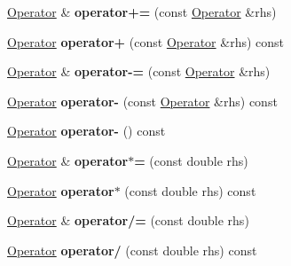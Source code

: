 \begin{DoxyCompactItemize}
\item 
\hypertarget{classOperator_a0b20b0fedb0f49c4a2e69507cdcb540b}{\hyperlink{classOperator}{Operator} \& {\bfseries operator+=} (const \hyperlink{classOperator}{Operator} \&rhs)}\label{classOperator_a0b20b0fedb0f49c4a2e69507cdcb540b}

\item 
\hypertarget{classOperator_a67d89d71379a609aa018178afe1adb8d}{\hyperlink{classOperator}{Operator} {\bfseries operator+} (const \hyperlink{classOperator}{Operator} \&rhs) const }\label{classOperator_a67d89d71379a609aa018178afe1adb8d}

\item 
\hypertarget{classOperator_a1235ee7e0ba5220a831ac0c01b2210b9}{\hyperlink{classOperator}{Operator} \& {\bfseries operator-\/=} (const \hyperlink{classOperator}{Operator} \&rhs)}\label{classOperator_a1235ee7e0ba5220a831ac0c01b2210b9}

\item 
\hypertarget{classOperator_ac25a9769a621623062b922cb9a40a489}{\hyperlink{classOperator}{Operator} {\bfseries operator-\/} (const \hyperlink{classOperator}{Operator} \&rhs) const }\label{classOperator_ac25a9769a621623062b922cb9a40a489}

\item 
\hypertarget{classOperator_aa06ee3d5828d7bc43b3aca693ac0ef25}{\hyperlink{classOperator}{Operator} {\bfseries operator-\/} () const }\label{classOperator_aa06ee3d5828d7bc43b3aca693ac0ef25}

\item 
\hypertarget{classOperator_a9398ce826d8ef57e69a1aa776734080f}{\hyperlink{classOperator}{Operator} \& {\bfseries operator$\ast$=} (const double rhs)}\label{classOperator_a9398ce826d8ef57e69a1aa776734080f}

\item 
\hypertarget{classOperator_a0eeafc807e6ef6e3d30810f114e249bb}{\hyperlink{classOperator}{Operator} {\bfseries operator$\ast$} (const double rhs) const }\label{classOperator_a0eeafc807e6ef6e3d30810f114e249bb}

\item 
\hypertarget{classOperator_a53af250702ec7c48de5397b209ebc09e}{\hyperlink{classOperator}{Operator} \& {\bfseries operator/=} (const double rhs)}\label{classOperator_a53af250702ec7c48de5397b209ebc09e}

\item 
\hypertarget{classOperator_a60c6e3fa8da186a1183e540e6ff04421}{\hyperlink{classOperator}{Operator} {\bfseries operator/} (const double rhs) const }\label{classOperator_a60c6e3fa8da186a1183e540e6ff04421}


\end{DoxyCompactItemize}
